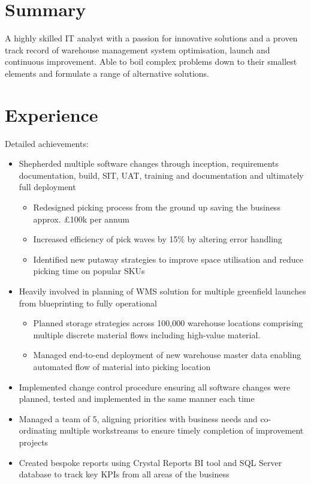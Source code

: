 \documentclass[11pt,a4paper]{moderncv}
\begin{document}
\makecvtitle

\section{Summary}
A highly skilled IT analyst with a passion for innovative solutions and a proven track record of warehouse management system optimisation, launch and continuous improvement. Able to boil complex problems down to their smallest elements and formulate a range of alternative solutions.

\section{Experience}
Detailed achievements:%
\begin{itemize}
\item Shepherded multiple software changes through inception, requirements documentation, build, SIT, UAT, training and documentation and ultimately full deployment
\begin{itemize}
    \item Redesigned picking process from the ground up saving the business approx. £100k per annum
    \item Increased efficiency of pick waves by 15\% by altering error handling
    \item Identified new putaway strategies to improve space utilisation and reduce picking time on popular SKUs
\end{itemize}
\item Heavily involved in planning of WMS solution for multiple greenfield launches from blueprinting to fully operational
\begin{itemize}
    \item Planned storage strategies across 100,000 warehouse locations comprising multiple discrete material flows including high-value material.
    \item Managed end-to-end deployment of new warehouse master data enabling automated flow of material into picking location
\end{itemize}
\item Implemented change control procedure ensuring all software changes were planned, tested and implemented in the same manner each time
\item Managed a team of 5, aligning priorities with business needs and co-ordinating multiple workstreams to ensure timely completion of improvement projects
\item Created bespoke reports using Crystal Reports BI tool and SQL Server database to track key KPIs from all areas of the business
\end{itemize}
\pagebreak
\end{document}
